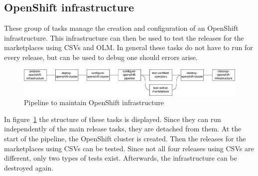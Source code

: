 \subsection{OpenShift infrastructure}\label{subsec:openshift-infrastructure}

These group of tasks manage the creation and configuration of an OpenShift infrastructure.
This infrastructure can then be used to test the releases for the marketplaces using CSVs and OLM.
In general these tasks do not have to run for every release, but can be used to debug one should errors arise.

\begin{figure}[H]
    \centering
    \includegraphics[width=\textwidth]{img/implementation/openshift}
    \caption{Pipeline to maintain OpenShift infrastructure}
    \label{fig:pipeline-to-maintain-openshift-infrastructure}
\end{figure}

In figure~\ref{fig:pipeline-to-maintain-openshift-infrastructure} the structure of these tasks is displayed.
Since they can run independently of the main release tasks, they are detached from them.
At the start of the pipeline, the OpenShift cluster is created.
Then the releases for the marketplaces using CSVs can be tested.
Since not all four releases using CSVs are different, only two types of tests exist.
Afterwards, the infrastructure can be destroyed again.







\pagebreak



\pagebreak







